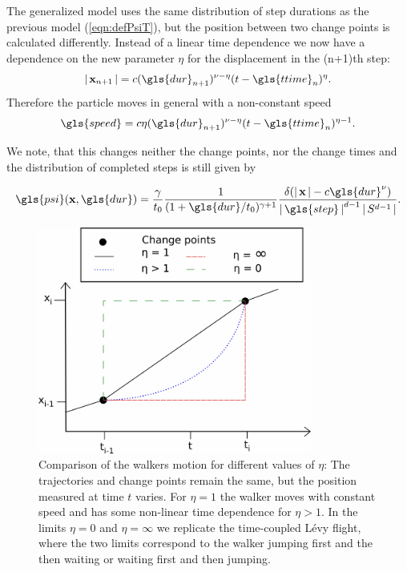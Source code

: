 The generalized model uses the same distribution of step durations as the previous model (\ref{eqn:defPsiT}), but the position between two change points is calculated differently. Instead of a linear time dependence we now have a dependence on the new parameter $\eta$ for the displacement in the (n+1)th step:
%
\begin{align}
\abs{\ve{x}_{n+1}} = c (\gls{dur}_{n+1})^{\nu-\eta} (t-\gls{ttime}_n)^{\eta} .
\end{align}
%
Therefore the particle moves in general with a non-constant speed  
%
\begin{align}
\gls{speed} = c \eta (\gls{dur}_{n+1})^{\nu-\eta} (t-\gls{ttime}_n)^{\eta-1} .
\end{align}

We note, that this changes neither the change points, nor the change times and the distribution of completed steps is still given by 

\begin{align}
\gls{psi}(\ve{x}, \gls{dur} ) = \frac{\gamma}{t_0} \frac{1}{(1+\gls{dur}/t_0)^{\gamma+1}}  \frac{\delta(\abs{\ve{x}} - c \gls{dur}^{\nu}) }{\abs{\gls{step}}^{d-1} \abs{S^{d-1}}}  .
\end{align}


\begin{figure}
\begin{center}
\includegraphics[width=90mm]{pics/turningPoints.png}
\caption{Comparison of the walkers motion for different values of $\eta$: The trajectories and change points remain the same, but the position measured at time $t$ varies. For $\eta = 1$ the walker moves with constant speed and has some non-linear time dependence for $\eta > 1$. In the limits $\eta = 0$ and $\eta = \infty$ we replicate the time-coupled L\'evy flight, where the two limits correspond to the walker jumping first and the then waiting or waiting first and then jumping. 
\label{fig:turningPoints}}
\end{center}
\end{figure}

